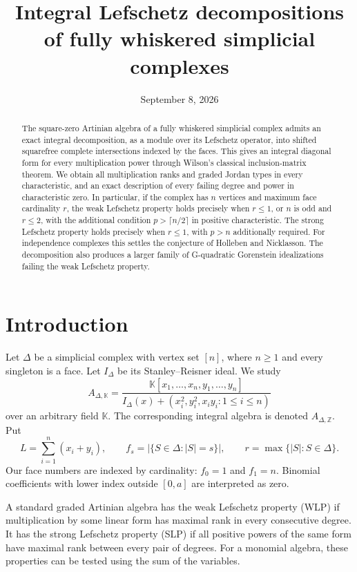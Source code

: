 \documentclass[11pt]{article}
\title{Integral Lefschetz decompositions of fully whiskered simplicial complexes}
\author{}
\date{September 8, 2026}
\theoremstyle{remark}
\newcommand{\kk}{\mathbb K}
\newcommand{\ZZ}{\mathbb Z}
\begin{document}
\maketitle
\begin{abstract}
The square-zero Artinian algebra of a fully whiskered simplicial complex admits an exact integral decomposition, as a module over its Lefschetz operator, into shifted squarefree complete intersections indexed by the faces. This gives an integral diagonal form for every multiplication power through Wilson's classical inclusion-matrix theorem. We obtain all multiplication ranks and graded Jordan types in every characteristic, and an exact description of every failing degree and power in characteristic zero. In particular, if the complex has $n$ vertices and maximum face cardinality $r$, the weak Lefschetz property holds precisely when $r\leq1$, or $n$ is odd and $r\leq2$, with the additional condition $p>\lceil n/2\rceil$ in positive characteristic. The strong Lefschetz property holds precisely when $r\leq1$, with $p>n$ additionally required. For independence complexes this settles the conjecture of Holleben and Nicklasson. The decomposition also produces a larger family of G-quadratic Gorenstein idealizations failing the weak Lefschetz property.
\end{abstract}

\section{Introduction}
Let $\Delta$ be a simplicial complex with vertex set $[n]$, where $n\geq1$ and every singleton is a face. Let $I_\Delta$ be its Stanley--Reisner ideal. We study
\begin{equation}\label{eq:algebra}
 A_{\Delta,\kk}=
 \frac{\kk[x_1,\ldots,x_n,y_1,\ldots,y_n]}
 {I_\Delta(x)+(x_i^2,y_i^2,x_i y_i:1\leq i\leq n)}
\end{equation}
over an arbitrary field $\kk$. The corresponding integral algebra is denoted $A_{\Delta,\ZZ}$. Put
\[
 L=\sum_{i=1}^n(x_i+y_i),\qquad
 f_s=|\{S\in\Delta:|S|=s\}|,\qquad
 r=\max\{|S|:S\in\Delta\}.
\]
Our face numbers are indexed by cardinality: $f_0=1$ and $f_1=n$. Binomial coefficients with lower index outside $[0,a]$ are interpreted as zero.

A standard graded Artinian algebra has the weak Lefschetz property (WLP) if multiplication by some linear form has maximal rank in every consecutive degree. It has the strong Lefschetz property (SLP) if all positive powers of the same form have maximal rank between every pair of degrees. For a monomial algebra, these properties can be tested using the sum of the variables.
\end{document}
